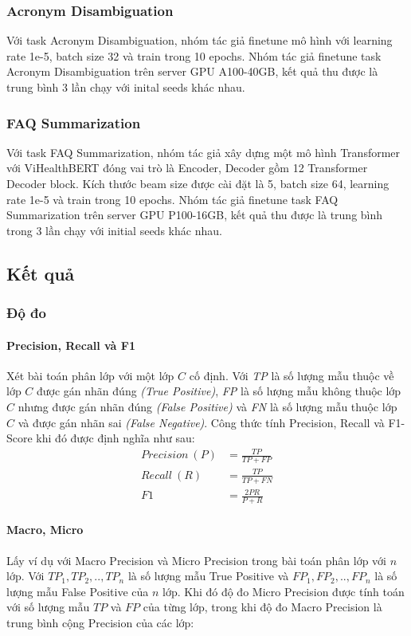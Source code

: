 \subsubsection{Acronym Disambiguation}
Với task Acronym Disambiguation, nhóm tác giả finetune mô hình với learning rate 1e-5, batch size 32 và train trong 10 epochs. Nhóm tác giả finetune task Acronym Disambiguation trên server GPU A100-40GB, kết quả thu được là trung bình 3 lần chạy với inital seeds khác nhau.

\subsubsection{FAQ Summarization}
Với task FAQ Summarization, nhóm tác giả xây dựng một mô hình Transformer với ViHealthBERT đóng vai trò là Encoder, Decoder gồm 12 Transformer Decoder block. Kích thước beam size được cài đặt là 5, batch size 64, learning rate 1e-5 và train trong 10 epochs. Nhóm tác giả finetune task FAQ Summarization trên server GPU P100-16GB, kết quả thu được là trung bình trong 3 lần chạy với initial seeds khác nhau. 

\subsection{Kết quả}
\subsubsection{Độ đo}
\paragraph{Precision, Recall và F1}
Xét bài toán phân lớp với một lớp $C$ cố định. Với \textit{TP} là số lượng mẫu thuộc về lớp $C$ được gán nhãn đúng \textit{(True Positive)}, \textit{FP} là số lượng mẫu không thuộc lớp $C$ nhưng được gán nhãn đúng \textit{(False Positive)} và \textit{FN} là số lượng mẫu thuộc lớp $C$ và được gán nhãn sai \textit{(False Negative)}. Công thức tính Precision, Recall và F1-Score khi đó được định nghĩa như sau:
\begin{equation}
\begin{aligned}
Precision~(P) &= \frac{TP}{TP + FP} \\
Recall~(R) &= \frac{TP}{TP + FN} \\
F1 &= \frac{2PR}{P + R}
\end{aligned}
\end{equation}

\paragraph{Macro, Micro} Lấy ví dụ với Macro Precision và Micro Precision trong bài toán phân lớp với $n$ lớp. Với $TP_1, TP_2, .., TP_n$ là số lượng mẫu True Positive và $FP_1, FP_2, .., FP_n$ là số lượng mẫu False Positive của $n$ lớp. Khi đó độ đo Micro Precision được tính toán với số lượng mẫu $TP$ và $FP$ của từng lớp, trong khi độ đo Macro Precision là trung bình cộng Precision của các lớp:

